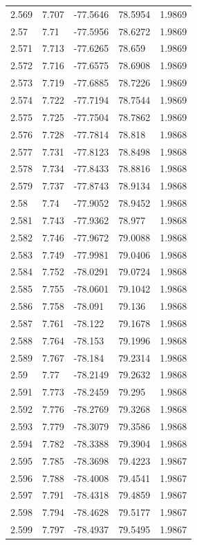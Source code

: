 \begin{tabular}{lllll}
2.569 & 7.707 & -77.5646 & 78.5954 & 1.9869 \\
2.57 & 7.71 & -77.5956 & 78.6272 & 1.9869 \\
2.571 & 7.713 & -77.6265 & 78.659 & 1.9869 \\
2.572 & 7.716 & -77.6575 & 78.6908 & 1.9869 \\
2.573 & 7.719 & -77.6885 & 78.7226 & 1.9869 \\
2.574 & 7.722 & -77.7194 & 78.7544 & 1.9869 \\
2.575 & 7.725 & -77.7504 & 78.7862 & 1.9869 \\
2.576 & 7.728 & -77.7814 & 78.818 & 1.9868 \\
2.577 & 7.731 & -77.8123 & 78.8498 & 1.9868 \\
2.578 & 7.734 & -77.8433 & 78.8816 & 1.9868 \\
2.579 & 7.737 & -77.8743 & 78.9134 & 1.9868 \\
2.58 & 7.74 & -77.9052 & 78.9452 & 1.9868 \\
2.581 & 7.743 & -77.9362 & 78.977 & 1.9868 \\
2.582 & 7.746 & -77.9672 & 79.0088 & 1.9868 \\
2.583 & 7.749 & -77.9981 & 79.0406 & 1.9868 \\
2.584 & 7.752 & -78.0291 & 79.0724 & 1.9868 \\
2.585 & 7.755 & -78.0601 & 79.1042 & 1.9868 \\
2.586 & 7.758 & -78.091 & 79.136 & 1.9868 \\
2.587 & 7.761 & -78.122 & 79.1678 & 1.9868 \\
2.588 & 7.764 & -78.153 & 79.1996 & 1.9868 \\
2.589 & 7.767 & -78.184 & 79.2314 & 1.9868 \\
2.59 & 7.77 & -78.2149 & 79.2632 & 1.9868 \\
2.591 & 7.773 & -78.2459 & 79.295 & 1.9868 \\
2.592 & 7.776 & -78.2769 & 79.3268 & 1.9868 \\
2.593 & 7.779 & -78.3079 & 79.3586 & 1.9868 \\
2.594 & 7.782 & -78.3388 & 79.3904 & 1.9868 \\
2.595 & 7.785 & -78.3698 & 79.4223 & 1.9867 \\
2.596 & 7.788 & -78.4008 & 79.4541 & 1.9867 \\
2.597 & 7.791 & -78.4318 & 79.4859 & 1.9867 \\
2.598 & 7.794 & -78.4628 & 79.5177 & 1.9867 \\
2.599 & 7.797 & -78.4937 & 79.5495 & 1.9867 \\

\end{tabular}
